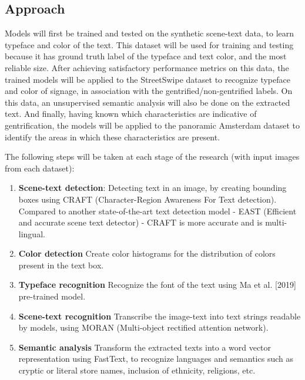 \subsection{Approach}
Models will first be trained and tested on the synthetic scene-text data, to learn typeface and color of the text. This dataset will be used for training and testing because it has ground truth label of the typeface and text color, and the most reliable size. After achieving satisfactory performance metrics on this data, the trained models will be applied to the StreetSwipe dataset to recognize typeface and color of signage, in association with the gentrified/non-gentrified labels. On this data, an unsupervised semantic analysis will also be done on the extracted text. And finally, having known which characteristics are indicative of gentrification, the models will be applied to the panoramic Amsterdam dataset to identify the areas in which these characteristics are present.

The following steps will be taken at each stage of the research (with input images from each dataset):
\begin{enumerate}
    \item \textbf{Scene-text detection}: Detecting text in an image, by creating bounding boxes using CRAFT (Character-Region Awareness For Text detection). Compared to another state-of-the-art text detection model - EAST (Efficient and accurate scene text detector) - CRAFT is more accurate and is multi-lingual.
    \item \textbf{Color detection} Create color histograms for the distribution of colors present in the text box.
    \item \textbf{Typeface recognition} Recognize the font of the text using Ma et al. [2019] pre-trained model.
    \item \textbf{Scene-text recognition} Transcribe the image-text into text strings readable by models, using MORAN (Multi-object rectified attention network).
    \item \textbf{Semantic analysis} Transform the extracted texts into a word vector representation using FastText, to recognize languages and semantics such as cryptic or literal store names, inclusion of ethnicity, religions, etc.
\end{enumerate}



